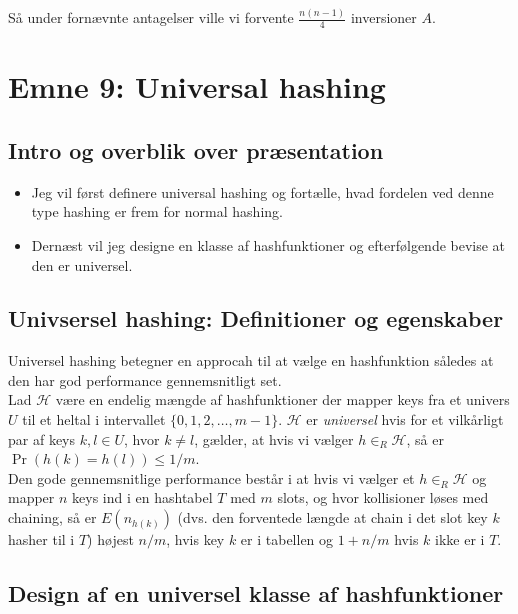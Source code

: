 \documentclass[12pt]{article}
\begin{document}
Så under fornævnte antagelser ville vi forvente $\frac{n(n-1)}{4}$ inversioner $A$. \\


\newpage

\section{Emne 9: Universal hashing}

\subsection*{Intro og overblik over præsentation}

\begin{itemize}
    \item Jeg vil først definere universal hashing og fortælle, hvad fordelen ved denne type hashing er frem for normal hashing. 
    \item Dernæst vil jeg designe en klasse af hashfunktioner og efterfølgende bevise at den er universel. 
\end{itemize}

\subsection*{Univsersel hashing: Definitioner og egenskaber}

Universel hashing betegner en approcah til at vælge en hashfunktion således at den har god performance gennemsnitligt set. \\

Lad $\mathcal{H}$ være en endelig mængde af hashfunktioner der mapper keys fra et univers $U$ til et heltal i intervallet $\{0,1,2,\ldots, m-1\}$. $\mathcal{H}$ er \textit{universel} hvis for et vilkårligt par af keys $k,l \in U$, hvor $k \ne l$, gælder, at hvis vi vælger $h \in_R \mathcal{H}$, så er $\Pr(h(k)=h(l)) \le 1/m$. \\

Den gode gennemsnitlige performance består i at hvis vi vælger et $h \in_R \mathcal{H}$ og mapper $n$ keys ind i en hashtabel $T$ med $m$ slots, og hvor kollisioner løses med chaining, så er $E(n_{h(k)})$ (dvs. den forventede længde at chain i det slot key $k$ hasher til i $T$) højest $n/m$, hvis key $k$ er i tabellen og $1+n/m$ hvis $k$ ikke er i $T$. 

\subsection*{Design af en universel klasse af hashfunktioner}
\end{document}
